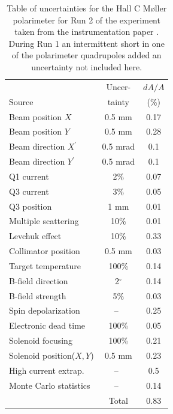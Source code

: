 \begin{table}[!h]
  \centering
    \begin{tabular}{|l|c|c|} \hline
                           & Uncer- & $dA/A$ \\ 
      Source & tainty & (\%) \\ \hline
      Beam position $X$     & 0.5 mm      & 0.17     \\
      Beam position $Y$     & 0.5 mm      & 0.28     \\
      Beam direction $X^\prime$    & 0.5 mrad    & 0.1      \\
      Beam direction $Y^\prime$    & 0.5 mrad    & 0.1      \\
      Q1 current                 & 2\%         & 0.07     \\
      Q3 current                 & 3\%         & 0.05     \\
      Q3 position                & 1 mm        & 0.01     \\
      Multiple scattering        & 10\%        & 0.01     \\
      Levchuk effect             & 10\%        & 0.33     \\
      Collimator position        & 0.5 mm      & 0.03     \\
      Target temperature         & 100\%       & 0.14     \\
      B-field direction          & 2$^\circ$   & 0.14     \\
      B-field strength           & 5\%         & 0.03     \\
      Spin depolarization        & --~         & 0.25     \\
      Electronic dead time       & 100\%       & 0.05     \\
      Solenoid focusing          & 100\%       & 0.21     \\
      Solenoid position($X,Y$)     & 0.5 mm       & 0.23     \\
      High current extrap. & --~         & 0.5      \\
      Monte Carlo statistics     & --~         & 0.14     \\ \hline
      ~                          & Total       & 0.83     \\ \hline
    \end{tabular}
  \caption{{Table of uncertainties for the Hall C M\o ller polarimeter for Run 2 of the experiment taken from the \Qs instrumentation paper \cite{QweakNIM}. During Run 1 an intermittent short in one of the polarimeter quadrupoles added an uncertainty not included here.}}
  \label{tab:moller_systematics}
\end{table}

